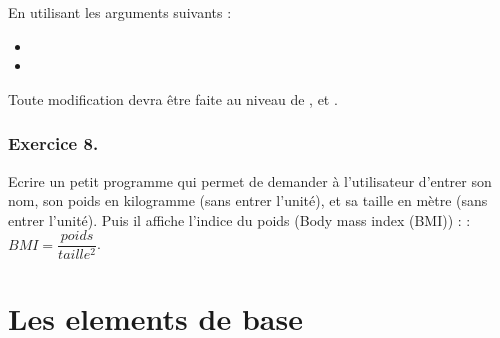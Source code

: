 \documentclass[letterpaper,10pt,french]{sphinxmanual}
\begin{document}
\begin{sphinxVerbatim}[commandchars=\\\{\}]
      
\end{sphinxVerbatim}

\sphinxAtStartPar
En utilisant les arguments suivants :
\begin{itemize}
\item {} 
\sphinxAtStartPar
{}

\item {} 
\sphinxAtStartPar
{}

\end{itemize}

\sphinxAtStartPar
Toute modification devra être faite au niveau de , et .

\begin{sphinxVerbatim}[commandchars=\\\{\}]
\end{sphinxVerbatim}




\subsection{Exercice 8.}
\label{\detokenize{exo1:exercice-8}}
\sphinxAtStartPar
Ecrire un petit programme qui permet de demander à l’utilisateur d’entrer son nom, son poids en kilogramme (sans entrer l’unité), et sa taille en mètre (sans entrer l’unité). Puis il affiche l’indice du poids (Body mass index (BMI)) :
 : \(BMI = \dfrac{poids}{taille^2}\).

\begin{sphinxVerbatim}[commandchars=\\\{\}]
\end{sphinxVerbatim}


\chapter{Les elements de base}
\label{\detokenize{content2:les-elements-de-base}}\label{\detokenize{content2::doc}}
\end{document}
